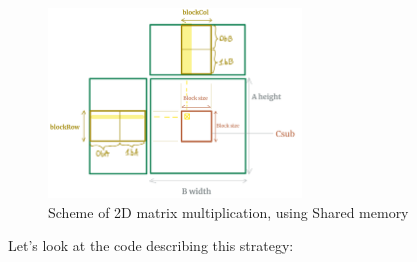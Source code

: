 \documentclass[12pt]{article}
\begin{document}
\begin{figure}[h!]
   \begin{center}
   \includegraphics[width=0.6\textwidth]{pngs/globalmatrix.png}
   \end{center}
   \vspace{-0.5cm}
   \captionsetup{justification=raggedleft}
   \caption{Scheme of 2D matrix multiplication, using Shared memory}
   \label{global2d}
\end{figure}


Let's look at the code describing this strategy:
\end{document}
